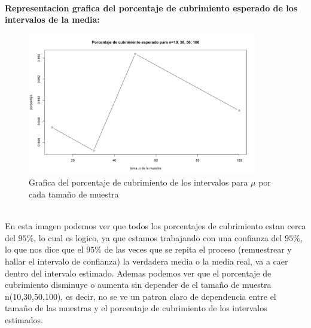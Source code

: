 \documentclass[letterpaper,12pt,onecolumn,titlepage]{article}
\begin{document}
~\\\textbf{Representacion grafica del porcentaje de cubrimiento esperado de los intervalos de la media:}
~\\ \begin{figure}[!h]
    \begin{center}
        \includegraphics[width=10cm]{Figuras/Pa1.png}
        \caption{Grafica del porcentaje de cubrimiento de los intervalos para $\mu$ por cada tama\~{n}o de muestra}
        \label{fig:Densidad}
    \end{center}
\end{figure}
~\\ En esta imagen podemos ver que todos los porcentajes de cubrimiento estan cerca del $95\%$, lo cual es logico, ya que estamos trabajando con una confianza del $95\%$, lo que nos dice que el $95\%$ de las veces que se repita el proceso (remuestrear y hallar el intervalo de confianza) la verdadera media o la media real, va a caer dentro del intervalo estimado. Ademas podemos ver que el porcentaje de cubrimiento disminuye o aumenta sin depender de el tama\~{n}o de muestra n(10,30,50,100), es decir, no se ve un patron claro de dependencia entre el tama\~{n}o de las muestras y el porcentaje de cubrimiento de los intervalos estimados.
\end{document}
